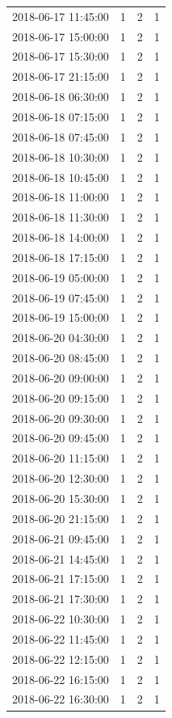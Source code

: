 \begin{tabular}{lrrr}
2018-06-17 11:45:00 & 1 & 2 & 1 \\
2018-06-17 15:00:00 & 1 & 2 & 1 \\
2018-06-17 15:30:00 & 1 & 2 & 1 \\
2018-06-17 21:15:00 & 1 & 2 & 1 \\
2018-06-18 06:30:00 & 1 & 2 & 1 \\
2018-06-18 07:15:00 & 1 & 2 & 1 \\
2018-06-18 07:45:00 & 1 & 2 & 1 \\
2018-06-18 10:30:00 & 1 & 2 & 1 \\
2018-06-18 10:45:00 & 1 & 2 & 1 \\
2018-06-18 11:00:00 & 1 & 2 & 1 \\
2018-06-18 11:30:00 & 1 & 2 & 1 \\
2018-06-18 14:00:00 & 1 & 2 & 1 \\
2018-06-18 17:15:00 & 1 & 2 & 1 \\
2018-06-19 05:00:00 & 1 & 2 & 1 \\
2018-06-19 07:45:00 & 1 & 2 & 1 \\
2018-06-19 15:00:00 & 1 & 2 & 1 \\
2018-06-20 04:30:00 & 1 & 2 & 1 \\
2018-06-20 08:45:00 & 1 & 2 & 1 \\
2018-06-20 09:00:00 & 1 & 2 & 1 \\
2018-06-20 09:15:00 & 1 & 2 & 1 \\
2018-06-20 09:30:00 & 1 & 2 & 1 \\
2018-06-20 09:45:00 & 1 & 2 & 1 \\
2018-06-20 11:15:00 & 1 & 2 & 1 \\
2018-06-20 12:30:00 & 1 & 2 & 1 \\
2018-06-20 15:30:00 & 1 & 2 & 1 \\
2018-06-20 21:15:00 & 1 & 2 & 1 \\
2018-06-21 09:45:00 & 1 & 2 & 1 \\
2018-06-21 14:45:00 & 1 & 2 & 1 \\
2018-06-21 17:15:00 & 1 & 2 & 1 \\
2018-06-21 17:30:00 & 1 & 2 & 1 \\
2018-06-22 10:30:00 & 1 & 2 & 1 \\
2018-06-22 11:45:00 & 1 & 2 & 1 \\
2018-06-22 12:15:00 & 1 & 2 & 1 \\
2018-06-22 16:15:00 & 1 & 2 & 1 \\
2018-06-22 16:30:00 & 1 & 2 & 1 \\

\end{tabular}
